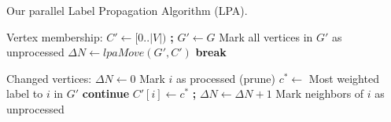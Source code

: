 \begin{algorithm}[hbtp]
\caption{Our parallel Label Propagation Algorithm (LPA).}
\label{alg:rak}
\begin{algorithmic}[1]
 \label{alg:rak--main-begin}
  \State Vertex membership: $C' \gets [0 .. |V|)$ \textbf{;} $G' \gets G$ \label{alg:rak--initialization}
  \State Mark all vertices in $G'$ as unprocessed
  \ForAll{$l_i \in [0 .. \text{\small{MAX\_ITERATIONS}})$} \label{alg:rak--iterations-begin}
    \State $\Delta N \gets lpaMove(G', C')$ \label{alg:rak--propagate}
     \textbf{break}  \label{alg:rak--converged}
    \EndIf
  \EndFor \label{alg:rak--iterations-end}
\EndFunction \label{alg:rak--main-end}

\Statex

 \label{alg:rak--move-begin}
  \State Changed vertices: $\Delta N \gets 0$
    \State Mark $i$ as processed (prune) \label{alg:rak--prune}
    \State $c^* \gets$ Most weighted label to $i$ in $G'$ \label{alg:rak--best-community}
     \textbf{continue} \label{alg:rak--best-community-same}
    \EndIf
    \State $C'[i] \gets c^*$ \textbf{;} $\Delta N \gets \Delta N + 1$ \label{alg:rak--perform-move}
    \State Mark neighbors of $i$ as unprocessed \label{alg:rak--remark}
  \EndFor
{}
\EndFunction \label{alg:rak--move-end}
\end{algorithmic}
\end{algorithm}




